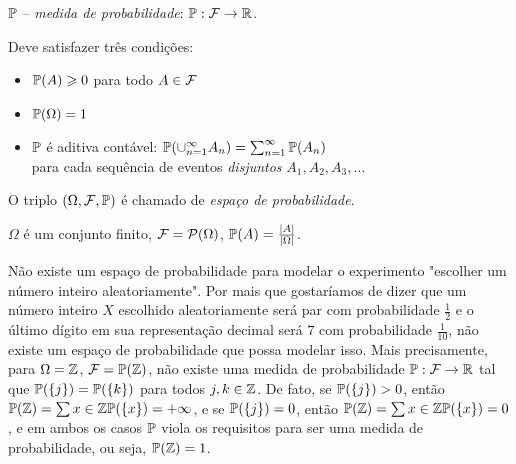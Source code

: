 $ \mathbb{P} $
--
\emph{medida de probabilidade}: $ \mathbb{P}:\mathcal F \to \mathbb{R} $.

Deve satisfazer três condições:
\begin{itemize}
\item
$ \mathbb{P}(A) \geqslant 0 $ para todo $ A \in \mathcal F $
\item
$ \mathbb{P}(\Omega)=1 $
\item
$ \mathbb{P} $ é aditiva contável:
$ \mathbb{P}(\cup_{n=1}^\infty A_n) = \sum_{n=1}^\infty \mathbb{P}(A_n) $
\\
para cada sequência de eventos \emph{disjuntos} $ A_1, A_2, A_3, \dots $
\end{itemize}

O triplo $ (\Omega,\mathcal F,\mathbb{P}) $ é chamado de \emph{espaço de probabilidade}.

\begin{example}
$ \Omega $ é um conjunto finito,
$ \mathcal F = \mathcal P(\Omega) $,
$ \mathbb{P}(A) = \frac{|A|}{|\Omega|} $.
\end{example}

\begin{example}
Não existe um espaço de probabilidade para modelar o experimento "escolher um número inteiro aleatoriamente".
Por mais que gostaríamos de dizer que um número inteiro $ X $ escolhido aleatoriamente será par com probabilidade $ \frac{1}{2} $ e o último dígito em sua representação decimal será $ 7 $ com probabilidade $ \frac{1}{10} $, não existe um espaço de probabilidade que possa modelar isso.
Mais precisamente, para $ \Omega = \mathbb{Z} $, $ \mathcal F = \mathbb{P}(\mathbb{Z}) $, não existe uma medida de probabilidade $ \mathbb{P}:\mathcal F\to \mathbb{R} $ tal que $ \mathbb{P}(\{j\})=\mathbb{P}(\{k\}) $ para todos $ j, k \in \mathbb{Z} $.
De fato,
se $ \mathbb{P}(\{j\})>0 $, então $ \mathbb{P}(\mathbb{Z})=\sum{x\in\mathbb{Z}} \mathbb{P}(\{x\}) = +\infty $,
e
se $ \mathbb{P}(\{j\})=0 $, então $ \mathbb{P}(\mathbb{Z})=\sum{x\in\mathbb{Z}} \mathbb{P}(\{x\}) = 0 $, e em ambos os casos $ \mathbb{P} $ viola os requisitos para ser uma medida de probabilidade, ou seja, $ \mathbb{P}(\mathbb{Z})=1 $.
\end{example}
